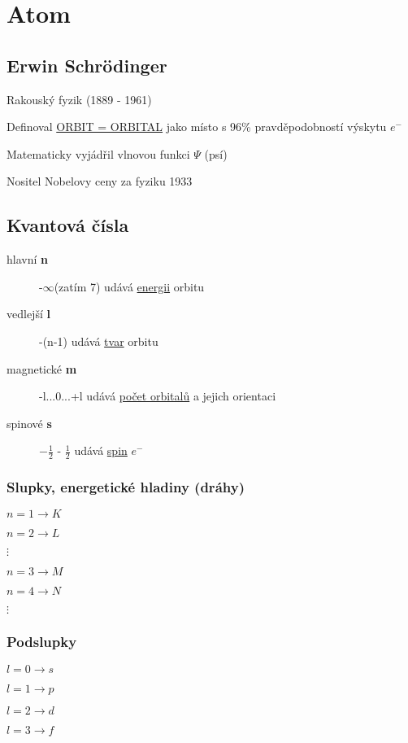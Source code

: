 \setlength{\parindent}{0px}
\section{Atom}
\subsection{Erwin Schrödinger}
Rakouský fyzik (1889 - 1961)

Definoval \underline{ORBIT = ORBITAL} jako místo s 96\% pravděpodobností výskytu $e^-$

Matematicky vyjádřil vlnovou funkci $\Psi$ (psí)

Nositel Nobelovy ceny za fyziku 1933

\TabPositions{0em, 12em, 25em}
\subsection{Kvantová čísla}
\begin{description}
    \item[hlavní \textbf{n}] -$\infty$(zatím 7) \tab udává \underline{energii} orbitu
    \item[vedlejší \textbf{l}] -(n-1) \tab udává \underline{tvar} orbitu
    \item[magnetické \textbf{m}] \tab -l...0...+l \tab udává \underline{počet orbitalů} a jejich orientaci
    \item[spinové \textbf{s}] \tab $-\frac{1}{2}$ - $\frac{1}{2}$ \tab udává \underline{spin} $e^-$
\end{description}

\centering
\subsubsection{Slupky, energetické hladiny (dráhy)}
\begin{multicols}{2}
    $n = 1 \to K$

    $n = 2 \to L$
    
    $\vdots$
    
    $n = 3 \to M$
    
    $n = 4 \to N$

    $\vdots$ 
\end{multicols}

\centering
\subsubsection{Podslupky}
\begin{multicols}{2}
    $l = 0 \to s$

    $l = 1 \to p$
    
    $l = 2 \to d$
    
    $l = 3 \to f$
\end{multicols}


